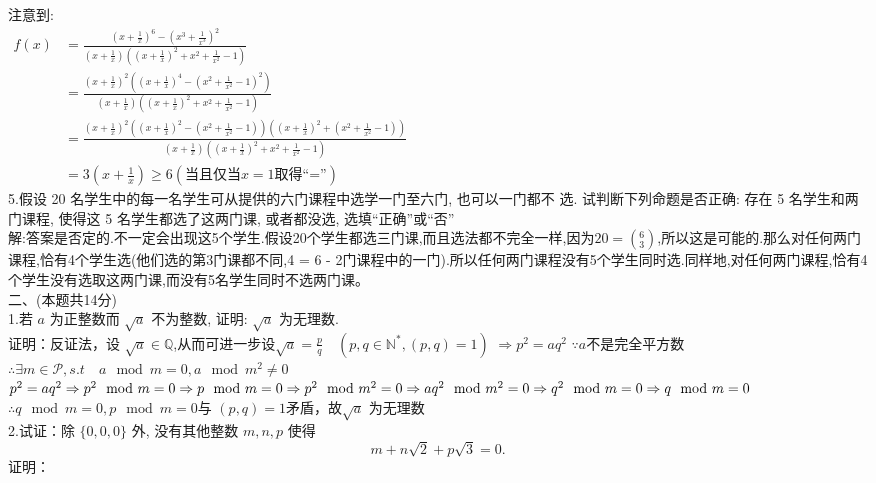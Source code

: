 \documentclass[a4paper,11pt,UTF8]{article}
\begin{document}
注意到:\\
$\begin{aligned}\displaystyle
	f(x)&=\frac{(x+\displaystyle\frac{1}{x})^6-(x^3+\displaystyle\frac{1}{x^3})^2}{(x+\displaystyle\frac{1}{x})((x+\displaystyle\frac{1}{x})^2+x^2+\displaystyle\frac{1}{x^2}-1)}\\
	&=\frac{(x+\displaystyle\frac{1}{x})^2((x+\displaystyle\frac{1}{x})^4-(x^2+\displaystyle\frac{1}{x^2}-1)^2)}{(x+\displaystyle\frac{1}{x})((x+\displaystyle\frac{1}{x})^2+x^2+\displaystyle\frac{1}{x^2}-1)}\\
	&=\frac{(x+\displaystyle\frac{1}{x})^2((x+\displaystyle\frac{1}{x})^2-(x^2+\displaystyle\frac{1}{x^2}-1))((x+\displaystyle\frac{1}{x})^2+(x^2+\displaystyle\frac{1}{x^2}-1))}{(x+\displaystyle\frac{1}{x})((x+\displaystyle\frac{1}{x})^2+x^2+\displaystyle\frac{1}{x^2}-1)}\\
	&=3(x+\frac{1}{x})\geq6(\text{当且仅当}x=1\text{取得“=”})
\end{aligned}$\\
5.假设 20 名学生中的每一名学生可从提供的六门课程中选学一门至六门, 也可以一门都不 选. 试判断下列命题是否正确: 存在 5 名学生和两门课程, 使得这 5 名学生都选了这两门课, 或者都没选, 选填“正确”或“否”\\
解:答案是否定的.不一定会出现这5个学生.假设20个学生都选三门课,而且选法都不完全一样,因为$\displaystyle20 =\left(^6_3\right)$,所以这是可能的.那么对任何两门课程,恰有4个学生选(他们选的第3门课都不同,4 = 6 - 2门课程中的一门).所以任何两门课程没有5个学生同时选.同样地,对任何两门课程,恰有4个学生没有选取这两门课,而没有5名学生同时不选两门课。\\
二、(本题共14分)\\
1.若 $a$ 为正整数而 $\sqrt{a}$ 不为整数, 证明: $\sqrt{a}$ 为无理数.\\
证明：反证法，设 $\displaystyle\sqrt{a}\in\mathbb{Q}$,从而可进一步设$\sqrt{a}=\frac{p}{q}\quad(p,q\in\mathbb{N^*},(p,q)=1)$
$\Rightarrow p^2=aq^2$
$\because a$不是完全平方数$\therefore \exists m\in\mathcal{P},s.t\quad a\mod m=0,a\mod m^2\neq0$\\
$p^2=aq^2\Rightarrow p^2\mod m =0\Rightarrow p\mod m =0\Rightarrow p^2\mod m^2=0\\\Rightarrow aq^2\mod m^2=0\Rightarrow q^2\mod m=0\Rightarrow q\mod m=0$\\
$\therefore q\mod m=0,p\mod m =0$与 $(p,q)=1$矛盾，故$\sqrt{a}$ 为无理数\\
2.试证：除 $\{0,0,0\}$ 外, 没有其他整数 $m, n, p$ 使得
$$
m+n \sqrt{2}+p \sqrt{3}=0 .
$$
证明：\\
\end{document}
